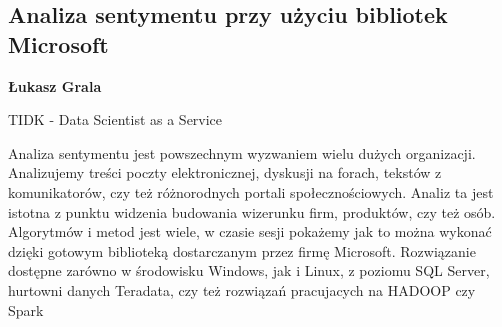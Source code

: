 \documentclass[\main/boa.tex]{subfiles}
\begin{document}
\subsection{Analiza sentymentu przy użyciu bibliotek Microsoft}

\begin{minipage}{0.915\textwidth}
	\centering
  {\bf {} Łukasz Grala}
\end{minipage}



\begin{affiliations}
\begin{minipage}{0.915\textwidth}
\centering
TIDK - Data Scientist as a Service  \\[-2pt]
\end{minipage}
\end{affiliations}

\vskip 0.3cm

Analiza sentymentu jest powszechnym wyzwaniem wielu dużych organizacji. Analizujemy treści poczty elektronicznej, dyskusji na forach, tekstów z komunikatorów, czy też różnorodnych portali społecznościowych. Analiz ta jest istotna z punktu widzenia budowania wizerunku firm, produktów, czy też osób. Algorytmów i metod jest wiele, w czasie sesji pokażemy jak to można wykonać dzięki gotowym biblioteką dostarczanym przez firmę Microsoft. Rozwiązanie dostępne zarówno w środowisku Windows, jak i Linux, z poziomu SQL Server, hurtowni danych Teradata, czy też rozwiązań pracujacych na HADOOP czy Spark
\end{document}
